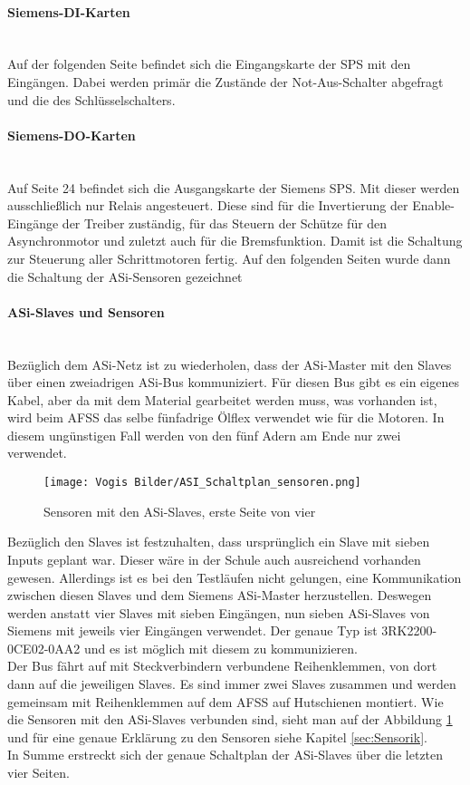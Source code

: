     \paragraph{Siemens-DI-Karten}\mbox{}\\
    Auf der folgenden Seite befindet sich die Eingangskarte der SPS mit den Eingängen. Dabei werden primär die Zustände der Not-Aus-Schalter abgefragt und die des Schlüsselschalters.
    \paragraph{Siemens-DO-Karten}\mbox{}\\
    Auf Seite 24 befindet sich die Ausgangskarte der Siemens SPS. Mit dieser werden ausschließlich nur Relais angesteuert. Diese sind für die Invertierung der Enable-Eingänge der Treiber zuständig, für das Steuern der Schütze für den Asynchronmotor und zuletzt auch für die Bremsfunktion. Damit ist die Schaltung zur Steuerung aller Schrittmotoren fertig. Auf den folgenden Seiten wurde dann die Schaltung der ASi-Sensoren gezeichnet
    \paragraph{ASi-Slaves und Sensoren}\mbox{}\\
    Bezüglich dem ASi-Netz ist zu wiederholen, dass der ASi-Master mit den Slaves über einen zweiadrigen ASi-Bus kommuniziert. Für diesen Bus gibt es ein eigenes Kabel, aber da mit dem Material gearbeitet werden muss, was vorhanden ist, wird beim AFSS das selbe fünfadrige Ölflex verwendet wie für die Motoren. In diesem ungünstigen Fall werden von den fünf Adern am Ende nur zwei verwendet.\\
    \begin{figure}[H]
        \centering
        \texttt{[image: Vogis Bilder/ASI\_Schaltplan\_sensoren.png]}
        \caption{Sensoren mit den ASi-Slaves, erste Seite von vier}
        \label{fig:ASI_Sensoren}
    \end{figure}
    Bezüglich den Slaves ist festzuhalten, dass ursprünglich ein Slave mit sieben Inputs geplant war. Dieser wäre in der Schule auch ausreichend vorhanden gewesen. Allerdings ist es bei den Testläufen nicht gelungen, eine Kommunikation zwischen diesen Slaves und dem Siemens ASi-Master herzustellen. Deswegen werden anstatt vier Slaves mit sieben Eingängen, nun sieben ASi-Slaves von Siemens mit jeweils vier Eingängen verwendet. Der genaue Typ ist 3RK2200-0CE02-0AA2 und es ist möglich mit diesem zu kommunizieren.\\
    Der Bus fährt auf mit Steckverbindern verbundene Reihenklemmen, von dort dann auf die jeweiligen Slaves. Es sind immer zwei Slaves zusammen und werden gemeinsam mit Reihenklemmen auf dem AFSS auf Hutschienen montiert. Wie die Sensoren mit den ASi-Slaves verbunden sind, sieht man auf der Abbildung \ref{fig:ASI_Sensoren} und für eine genaue Erklärung zu den Sensoren siehe Kapitel \ref{sec:Sensorik}.\\
    In Summe erstreckt sich der genaue Schaltplan der ASi-Slaves über die letzten vier Seiten.
